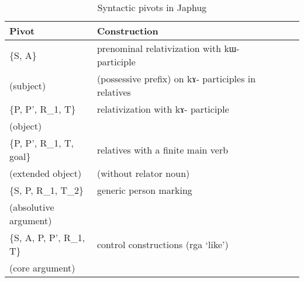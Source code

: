 \documentclass[oneside,a4paper,11pt]{article}
\newcommand{\ipa}[1]{{\phon #1}} %
\begin{document}
\begin{table}[H]
\caption{Syntactic pivots in Japhug} \label{tab:japhug.pivot} \centering
\begin{tabular}{llllll}
\toprule
Pivot & Construction \\
\midrule
\{S, A\}  & prenominal relativization with \ipa{kɯ-} participle  \\
 (subject)&(possessive prefix) on \ipa{kɤ-} participles in relatives \\
 \midrule
\{P, P', R_1, T\}  &relativization with \ipa{kɤ-} participle \\
(object)  & \\
\midrule
\{P, P', R_1, T, goal\} &
relatives with a finite main verb \\
(extended object) &(without relator noun)\\
\midrule
 \{S, P, R_1, T_2\} & generic person marking\\
 (absolutive argument)\\
 \midrule
  \{S, A, P, P', R_1, T\} & control constructions (\ipa{rga}  `like') \\
 (core argument)\\
\bottomrule
\end{tabular}
\end{table}





\end{document}
